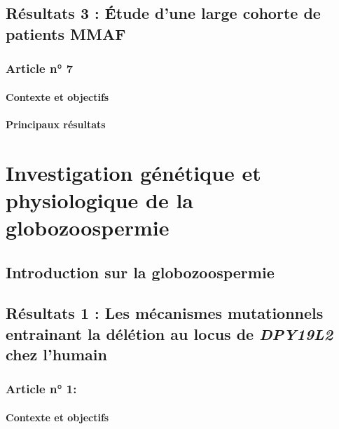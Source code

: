 \documentclass[12pt,twoside]{ugathesis}
\begin{document}
\section{Résultats 3 : Étude d'une large cohorte de patients
MMAF}\label{resultats-3-etude-dune-large-cohorte-de-patients-mmaf}

\subsection{Article n° 7}\label{article-n-7}

\subsubsection{Contexte et objectifs}\label{contexte-et-objectifs-4}

\subsubsection{Principaux résultats}\label{principaux-resultats-4}

\chapter{Investigation génétique et physiologique de la
globozoospermie}\label{globo}

\section{Introduction sur la
globozoospermie}\label{introduction-sur-la-globozoospermie}

\section{\texorpdfstring{Résultats 1 : Les mécanismes mutationnels
entrainant la délétion au locus de \emph{DPY19L2} chez
l'humain}{Résultats 1 : Les mécanismes mutationnels entrainant la délétion au locus de DPY19L2 chez l'humain}}\label{mecamut}

\subsection{Article n° 1:}\label{article-n-1}

\subsubsection{Contexte et objectifs}\label{contexte-et-objectifs-5}
\end{document}
